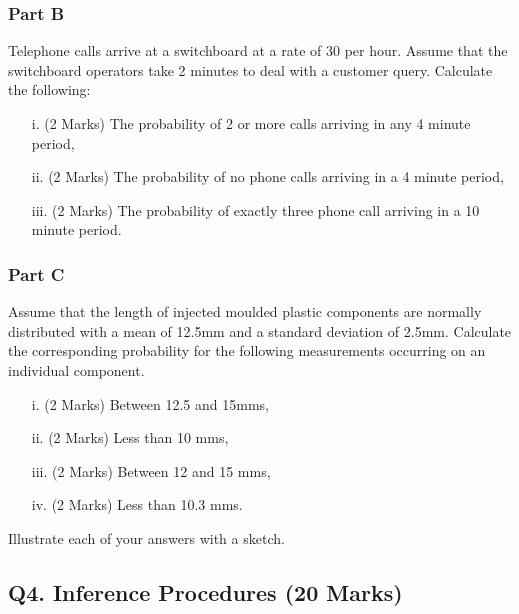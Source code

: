 \subsubsection*{Part B}%
Telephone calls arrive at a switchboard at a rate of 30 per hour.  Assume that the switchboard operators take 2 minutes to deal with a customer query. Calculate the following:

\begin{itemize}
\item [i.](2 Marks)	The probability of 2 or more calls arriving in any 4 minute period,
\item [ii.](2 Marks) The probability of no phone calls arriving in a 4 minute period,
\item [iii.](2 Marks) The probability of exactly three phone call arriving in a 10 minute period.

\end{itemize}
\subsubsection*{Part C} %
Assume that the length of injected moulded plastic components are normally distributed with a mean of 12.5mm and a standard deviation of 2.5mm.  Calculate the corresponding probability for the following measurements occurring on an individual component.

\begin{itemize}
\item [i.](2 Marks)	Between 12.5 and 15mms,
\item [ii.](2 Marks) Less than 10 mms,
\item [iii.](2 Marks) Between 12 and 15 mms,
\item [iv.](2 Marks) Less than 10.3 mms.
\end{itemize}
\noindent Illustrate each of your answers with a sketch.
\newpage


\subsection*{Q4. Inference Procedures (20 Marks)}

